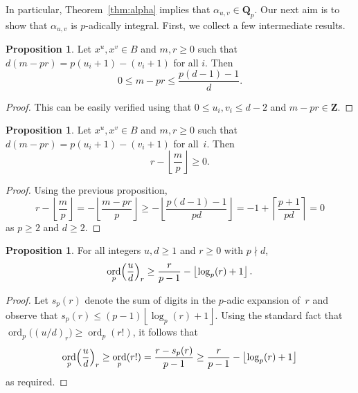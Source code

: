\documentclass[a4paper,11pt]{article}
\numberwithin{equation}{section}
\providecommand{\floor}[1]{\left\lfloor#1\right\rfloor}   %
\providecommand{\ceil}[1]{\left\lceil#1\right\rceil}   %
\newcommand{\ZZ}{\mathbf{Z}} %
\newcommand{\QQ}{\mathbf{Q}} %
\DeclareMathOperator{\ord}{ord}          %
\theoremstyle{definition}
\newtheorem{prop}[thm]{Proposition}
\begin{document}
In particular, Theorem~\ref{thm:alpha} implies that 
$\alpha_{u, v} \in \QQ_p$.  Our next aim is to show
that $\alpha_{u,v}$ is $p$-adically integral.  First, we collect a few 
intermediate results.

\begin{prop} \label{prop:mpr1}
Let $x^u, x^v \in B$ and 
$m, r \geq 0$ such that $d(m-pr) = p(u_i + 1) - (v_i + 1)$ for all $i$.  Then 
\begin{equation*}
0 \leq m - p r \leq \frac{p(d-1)-1}{d}.
\end{equation*}
\end{prop}

\begin{proof}
This can be easily verified using that $0 \leq u_i, v_i \leq d - 2$ 
and $m - pr \in \ZZ$.
\end{proof}

\begin{prop} \label{prop:mpr2}
Let $x^u, x^v \in B$ and $m, r \geq 0$ such that 
$d(m-pr) = p(u_i + 1) - (v_i + 1)$ for all~$i$.  Then 
\begin{equation*}
r - \floor{\frac{m}{p}} \geq 0.
\end{equation*}
\end{prop}

\begin{proof}
Using the previous proposition,
\begin{equation*}
r - \floor{\frac{m}{p}} 
= - \floor{\frac{m-pr}{p}} 
\geq - \floor{\frac{p(d-1)-1}{pd}} 
= -1 + \ceil{\frac{p + 1}{pd}} 
= 0 
\end{equation*}
as $p \geq 2$ and $d \geq 2$.
\end{proof}

\begin{prop} \label{prop:rfac}
For all integers $u, d \geq 1$ and $r \geq 0$ with $p \nmid d$, 
\begin{equation*}
\ord_p\Bigl(\frac{u}{d}\Bigr)_r \geq \frac{r}{p-1} - \floor{\log_p(r) + 1}.
\end{equation*}
\end{prop}

\begin{proof}
Let $s_p(r)$ denote the sum of digits in the $p$-adic expansion of~$r$ 
and observe that $s_p(r) \leq (p-1)\floor{\log_p(r) + 1}$.  Using the 
standard fact that $\ord_p\bigl((u/d)_r\bigr) \geq \ord_p(r!)$, 
it follows that 
\begin{equation*}
\ord_p\Bigl(\frac{u}{d}\Bigr)_r \geq \ord_p(r!) = \frac{r - s_p(r)}{p-1} \geq \frac{r}{p-1} - \floor{\log_p(r) + 1}
\end{equation*}
as required.
\end{proof}
\end{document}

